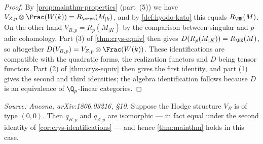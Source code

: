 \begin{proof}
  By \cref{prop:mainthm-properties} (part~(5))
  we have \(V_{Z,p} \otimes \Frac(W(k)) = R_\crys(M_{\vert k})\), and by
  \cref{def:hyodo-kato} this equals \(R_\HK(M)\). On the other hand
  \(V_{B,p} = R_p(M_{\vert K})\) by the comparison between singular and
  \(p\)-adic cohomology. Part (3) of \cref{thm:crys-equiv} then gives
  \(D(R_p(M_{\vert K})) = R_\HK(M)\), so altogether
  \(D(V_{B,p}) = V_{Z,p} \otimes \Frac(W(k))\). These identifications are
  compatible with the quadratic forms, the realization functors and \(D\) being
  tensor functors. Part (2) of \cref{thm:crys-equiv} then gives
  the first identity, and part (1) gives the second and third identities;
  the algebra identification follows because \(D\) is an equivalence of
  \(\Q_p\)-linear categories.
\end{proof}

\begin{proposition}
  \label{prop:ordinary-case}
  \textit{Source: Ancona, arXiv:1806.03216, \S10.}
  Suppose the Hodge structure \(V_B\) is of type \((0,0)\). Then \(q_{B,p}\) and
  \(q_{Z,p}\) are isomorphic --- in fact equal under the second identity of
  \cref{cor:crys-identifications} --- and hence \cref{thm:mainthm} holds in this
  case.
\end{proposition}

